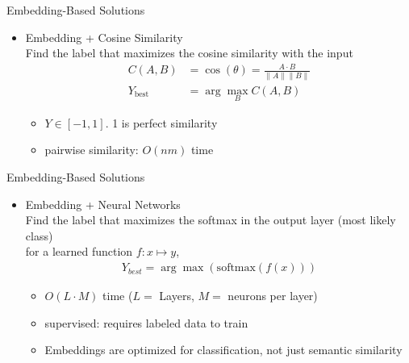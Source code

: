 \documentclass{beamer}
\begin{document}
\begin{frame}{Embedding-Based Solutions}
    \begin{itemize}
        \item Embedding + Cosine Similarity
        \\Find the label that maximizes the cosine similarity with the input
        \begin{align*}
            C(A,B) &= \cos(\theta) = \frac{A \cdot B}{\|A\| \|B\|}\\
            Y_{\text{best}} &= \arg\max_B C(A,B) 
        \end{align*}
        \begin{itemize}
            \item $Y \in [-1,1]$. 1 is perfect similarity
            \item pairwise similarity: $O(nm)$ time 
        \end{itemize}
    \end{itemize}
\end{frame}


\begin{frame}{Embedding-Based Solutions}
    \begin{itemize}
        \item Embedding + Neural Networks
        \\Find the label that maximizes the softmax in the output layer (most likely class)
        \\for a learned function $f: x \mapsto y $, 
        \begin{align*}
            Y_{best} = \arg\max (\text{softmax}(f(x)))
        \end{align*}
        \begin{itemize}
            \item $O(L \cdot M)$ time ($L=$ Layers, $M=$ neurons per layer)
            \item supervised: requires labeled data to train
            \item Embeddings are optimized for classification, not just semantic similarity
        \end{itemize}
    \end{itemize}
\end{frame}
\end{document}
